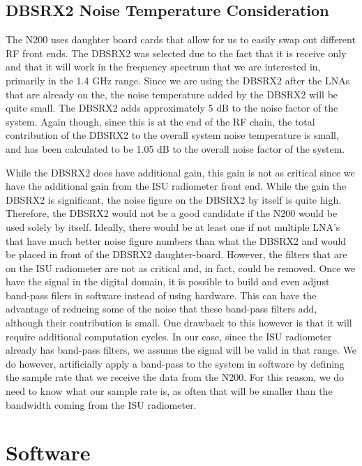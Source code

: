 \subsection{DBSRX2 Noise Temperature Consideration}

The N200 uses daughter board cards that allow for us to easily swap out different RF front ends.  The DBSRX2 was selected due to the fact that it is receive only and that it will work in the frequency spectrum that we are interested in, primarily in the 1.4 GHz range.  Since we are using the DBSRX2 after the LNAs that are already on the, the noise temperature added by the DBSRX2 will be quite small.  The DBSRX2 adds approximately 5 dB to the noise factor of the system.  Again though, since this is at the end of the RF chain, the total contribution of the DBSRX2 to the overall system noise temperature is small, and has been calculated to be 1.05 dB to the overall noise factor of the system.

While the DBSRX2 does have additional gain, this gain is not as critical since we have the additional gain from the ISU radiometer front end.  While the gain the DBSRX2 is significant, the noise figure on the DBSRX2 by itself is quite high.  Therefore, the DBSRX2 would not be a good candidate if the N200 would be used solely by itself.  Ideally, there would be at least one if not multiple LNA's that have much better noise figure numbers than what the DBSRX2 and would be placed in front of the DBSRX2 daughter-board.  However, the filters that are on the ISU radiometer are not as critical and, in fact, could be removed.  Once we have the signal in the digital domain, it is possible to build and even adjust band-pass filers in software instead of using hardware. This can have the advantage of reducing some of the noise that these band-pass filters add, although their contribution is small.  One drawback to this however is that it will require additional computation cycles.  In our case, since the ISU radiometer already has band-pass filters, we assume the signal will be valid in that range.  We do however, artificially apply a band-pass to the system in software by defining the sample rate that we receive the data from the N200.  For this reason, we do need to know what our sample rate is, as often that will be smaller than the bandwidth coming from the ISU radiometer. 

\section{Software}


